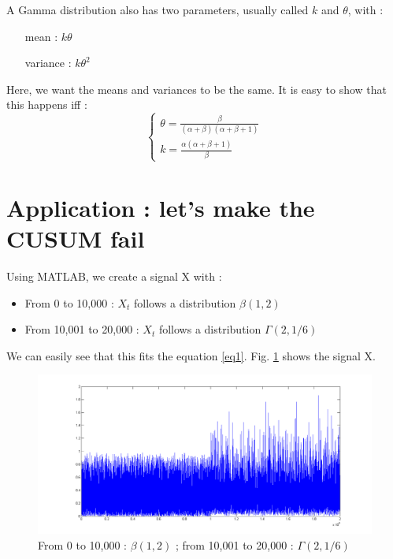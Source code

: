 \documentclass[french]{article}
\begin{document}
A Gamma distribution also has two parameters, usually called $k$ and $\theta$, with :
\begin{itemize}
	\item[mean] : $k \theta$
	\item[variance] : $k \theta ^2$
\end{itemize}
Here, we want the means and variances to be the same. It is easy to show that this happens iff :
\begin{equation}
	\left\lbrace 
	\begin{array}{l}
	 
	\theta = \frac{\beta}{(\alpha + \beta)(\alpha + \beta + 1)}\\
	 
	k = \frac{\alpha(\alpha + \beta + 1)}{\beta}
	 
	\end{array}\right.
	\label{eq1}
\end{equation}

\section{Application : let's make the CUSUM fail}
Using MATLAB, we create a signal X with :
\begin{itemize}
	\item From 0 to 10,000 : $X_t$ follows a distribution $\beta (1,2)$
	\item From 10,001 to 20,000 : $X_t$ follows a distribution $\Gamma (2, 1/6)$
\end{itemize}

We can easily see that this fits the equation \ref{eq1}. Fig. \ref{flaw} shows the signal X.

\begin{figure}[h]
	\includegraphics[scale=0.4]{flawsignal.png}
	\caption{From 0 to 10,000 : $\beta (1,2)$ ; from 10,001 to 20,000 : $\Gamma (2, 1/6)$}
	\label{flaw}
\end{figure}
\end{document}
